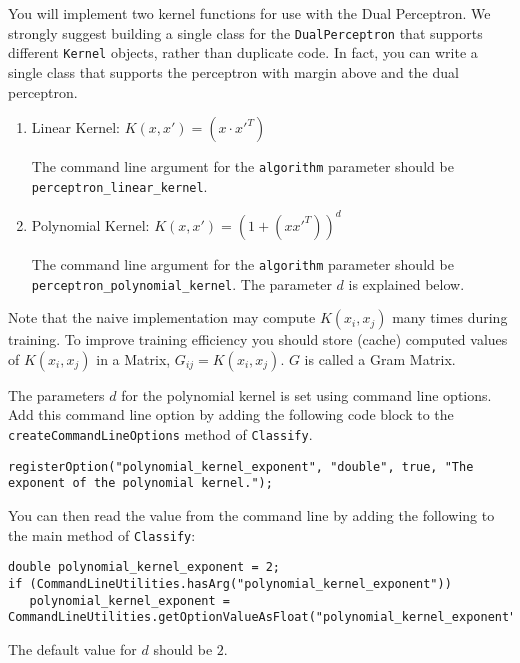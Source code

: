 \documentclass[11pt]{article}
\newcommand{\code}[1]{{\footnotesize \tt #1}}
\begin{document}
You will implement two kernel functions for use with the Dual Perceptron. We strongly suggest building a single class for the \code{DualPerceptron} that supports different \code{Kernel} objects, rather than duplicate code.
In fact, you can write a single class that supports the perceptron with margin above and the dual perceptron.
\begin{enumerate}
\item Linear Kernel: $K(x, x') = (x \cdot x'^T)$

The command line argument for the \code{algorithm} parameter should be \code{perceptron\_linear\_kernel}.

\item Polynomial Kernel: $K(x, x') = (1 + (x x'^T))^d$

The command line argument for the \code{algorithm} parameter should be \code{perceptron\_polynomial\_kernel}. The parameter $d$ is explained below.

\end{enumerate}

Note that the naive implementation may compute $K(x_i,x_j)$ many times during training. To improve training efficiency you should store (cache) computed values of $K(x_i,x_j)$ in a Matrix, $G_{ij}=K(x_i, x_j)$. $G$ is called a Gram Matrix.

The parameters $d$ for the polynomial kernel is set using command line options. Add this command line option by adding the following code block to the \code{createCommandLineOptions} method of \code{Classify}.

\begin{footnotesize}
\begin{verbatim}
registerOption("polynomial_kernel_exponent", "double", true, "The exponent of the polynomial kernel.");
\end{verbatim}
\end{footnotesize}

You can then read the value from the command line by adding the following to the main method of \code{Classify}:
\begin{footnotesize}
\begin{verbatim}
double polynomial_kernel_exponent = 2;
if (CommandLineUtilities.hasArg("polynomial_kernel_exponent"))
   polynomial_kernel_exponent = CommandLineUtilities.getOptionValueAsFloat("polynomial_kernel_exponent");
\end{verbatim}
\end{footnotesize}

The default value for $d$ should be $2$.
\end{document}
